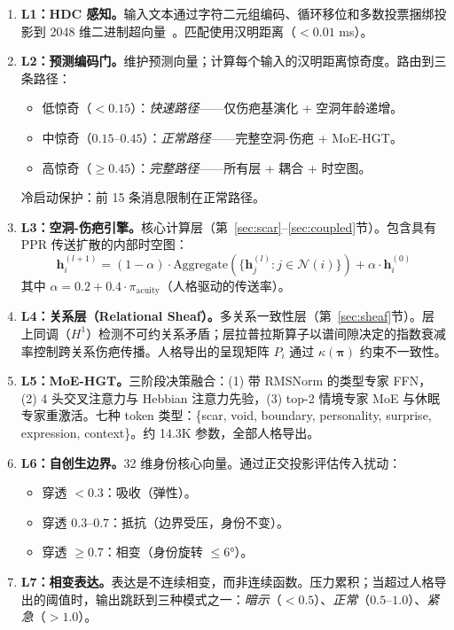 \documentclass[11pt]{article}
\begin{document}
\begin{enumerate}[leftmargin=*]
\item \textbf{L1：HDC 感知。}输入文本通过字符二元组编码、循环移位和多数投票捆绑投影到 2048 维二进制超向量~\cite{kanerva2009}。匹配使用汉明距离（$< 0.01$ ms）。

\item \textbf{L2：预测编码门。}维护预测向量；计算每个输入的汉明距离惊奇度。路由到三条路径：
\begin{itemize}
\item 低惊奇（$< 0.15$）：\emph{快速路径}——仅伤疤基演化 + 空洞年龄递增。
\item 中惊奇（$0.15$--$0.45$）：\emph{正常路径}——完整空洞-伤疤 + MoE-HGT。
\item 高惊奇（$\geq 0.45$）：\emph{完整路径}——所有层 + 耦合 + 时空图。
\end{itemize}
冷启动保护：前 15 条消息限制在正常路径。

\item \textbf{L3：空洞-伤疤引擎。}核心计算层（第~\ref{sec:scar}--\ref{sec:coupled}节）。包含具有 PPR 传送扩散的内部时空图：
\begin{equation}
\mathbf{h}_i^{(l+1)} = (1-\alpha) \cdot \text{Aggregate}(\{\mathbf{h}_j^{(l)} : j \in \mathcal{N}(i)\}) + \alpha \cdot \mathbf{h}_i^{(0)}
\end{equation}
其中 $\alpha = 0.2 + 0.4 \cdot \pi_{\text{acuity}}$（人格驱动的传送率）。

\item \textbf{L4：关系层（Relational Sheaf）。}多关系一致性层（第~\ref{sec:sheaf}节）。层上同调（$H^1$）检测不可约关系矛盾；层拉普拉斯算子以谱间隙决定的指数衰减率控制跨关系伤疤传播。人格导出的呈现矩阵 $P_i$ 通过 $\kappa(\boldsymbol{\pi})$ 约束不一致性。

\item \textbf{L5：MoE-HGT。}三阶段决策融合：(1) 带 RMSNorm 的类型专家 FFN，(2) 4 头交叉注意力与 Hebbian 注意力先验，(3) top-2 情境专家 MoE 与休眠专家重激活。七种 token 类型：\{scar, void, boundary, personality, surprise, expression, context\}。约 14.3K 参数，全部人格导出。

\item \textbf{L6：自创生边界。}32 维身份核心向量。通过正交投影评估传入扰动：
\begin{itemize}
\item 穿透 $< 0.3$：吸收（弹性）。
\item 穿透 $0.3$--$0.7$：抵抗（边界受压，身份不变）。
\item 穿透 $\geq 0.7$：相变（身份旋转 $\leq 6°$）。
\end{itemize}

\item \textbf{L7：相变表达。}表达是不连续相变，而非连续函数。压力累积；当超过人格导出的阈值时，输出跳跃到三种模式之一：\emph{暗示}（$< 0.5$）、\emph{正常}（$0.5$--$1.0$）、\emph{紧急}（$> 1.0$）。
\end{enumerate}
\end{document}

